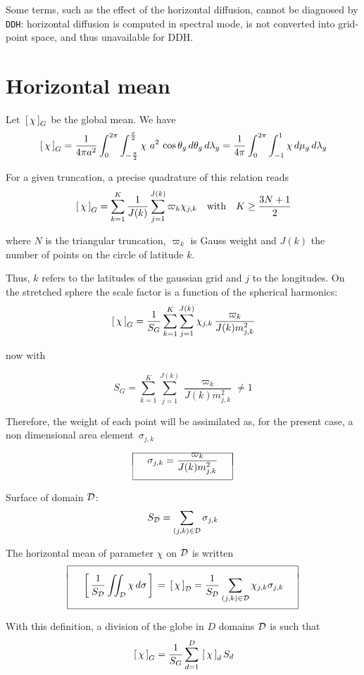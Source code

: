 \smallskip
Some terms, such as the effect of the horizontal diffusion, cannot be diagnosed by {\tt DDH}: horizontal diffusion is computed in spectral mode, is not converted into grid-point space, and thus unavailable for DDH.
\section{Horizontal mean}
Let $\lc \chi\rd_G$ be the global mean. We have
$$ \lc \chi\rd_G = \frac 1{4\pi a^2} \int_0^{2\pi} \int_{-\frac{\pi}2}^{\frac{\pi}2} \chi \ a^2 \, \cos\ta_g 
\,d\ta_g \,d\la_g = \frac 1{4\pi} \int_0^{2\pi} \int_{-1}^1 \chi \,d\mu_g \,d\la_g $$


For a given truncation, a precise quadrature of this relation reads
$$ \lc \chi\rd_G = \sum_{k=1}^K \frac 1{J(k)} \sum_{j=1}^{J(k)} \varpi_k \chi_{j,k} \quad \mbox{with} 
\quad K \geq \frac{3N+1}2 $$

where $N$ is the triangular truncation, $\varpi_k$ is Gauss weight and $J(k)$ the number of points on the circle of latitude $k$.

Thus, $k$ refers to the latitudes of the gaussian grid and $j$ to the longitudes. On the stretched sphere the scale factor is a function of the spherical harmonics:
$$ \lc \chi\rd_G = \frac 1{S_G} \sum_{k=1}^K \sum_{j=1}^{J(k)} \chi_{j,k} \, \frac{\varpi_k}{J(k) m_{j,k}^2} 
$$

\noi now with

$$ S_G = \sum_{k=1}^K \sum_{j=1}^{J(k)} \frac{\varpi_k}{J(k) m_{j,k}^2} \neq 1 $$

Therefore, the weight of each point will be assimilated as, for the present case, a non dimensional \og area element\fg\ $\sigma_{j,k}$

$$ \bay{|c|} \hline \\[-3ex]
\quad \ds \sigma_{j,k} = \frac{\varpi_k}{J(k) m_{j,k}^2} \quad \\[3ex] \hline \eay $$

Surface of domain $\cal D$:
$$ S_{\cal D} = \sum_{(j,k)\in {\cal D}} \sigma_{j,k} $$

The horizontal mean of parameter $\chi$ on $\cal D$ is written
$$ \bay{|c|} \hline \\[-1ex]
\quad \ds \lc \frac 1{S_{\cal D}} \iint_{\cal D} \chi\,d\sigma \rc = \lc \chi \rd_{\cal D} = \frac 1{S_{\cal 
D}} \sum_{(j,k) \in {\cal D}} \chi_{j,k} \sigma_{j,k} \quad \\[4ex] \hline \eay $$

With this definition, a division of the globe in $D$ domains $\cal D$ is such that 
$$ \lc \chi \rd_G = \frac 1{S_G}\sum_{d=1}^D \lc \chi \rd_d S_d $$

